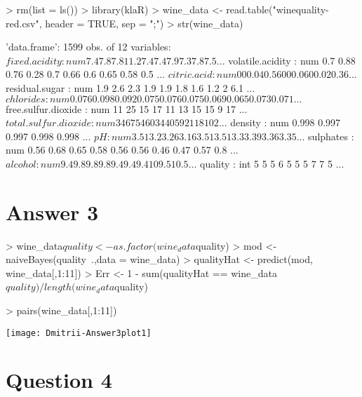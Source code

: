 \documentclass{article}
\begin{document}
\begin{Schunk}
\begin{Sinput}
> rm(list = ls())
> library(klaR)
> wine_data <- read.table("winequality-red.csv", header = TRUE, sep = ";")
> str(wine_data)
\end{Sinput}
\begin{Soutput}
'data.frame':	1599 obs. of  12 variables:
 $ fixed.acidity       : num  7.4 7.8 7.8 11.2 7.4 7.4 7.9 7.3 7.8 7.5 ...
 $ volatile.acidity    : num  0.7 0.88 0.76 0.28 0.7 0.66 0.6 0.65 0.58 0.5 ...
 $ citric.acid         : num  0 0 0.04 0.56 0 0 0.06 0 0.02 0.36 ...
 $ residual.sugar      : num  1.9 2.6 2.3 1.9 1.9 1.8 1.6 1.2 2 6.1 ...
 $ chlorides           : num  0.076 0.098 0.092 0.075 0.076 0.075 0.069 0.065 0.073 0.071 ...
 $ free.sulfur.dioxide : num  11 25 15 17 11 13 15 15 9 17 ...
 $ total.sulfur.dioxide: num  34 67 54 60 34 40 59 21 18 102 ...
 $ density             : num  0.998 0.997 0.997 0.998 0.998 ...
 $ pH                  : num  3.51 3.2 3.26 3.16 3.51 3.51 3.3 3.39 3.36 3.35 ...
 $ sulphates           : num  0.56 0.68 0.65 0.58 0.56 0.56 0.46 0.47 0.57 0.8 ...
 $ alcohol             : num  9.4 9.8 9.8 9.8 9.4 9.4 9.4 10 9.5 10.5 ...
 $ quality             : int  5 5 5 6 5 5 5 7 7 5 ...
\end{Soutput}
\end{Schunk}

\section*{Answer  3}

\begin{Schunk}
\begin{Sinput}
> wine_data$quality <- as.factor(wine_data$quality)
> mod <- naiveBayes(quality~.,data = wine_data)
> qualityHat <- predict(mod, wine_data[,1:11])
> Err <- 1 - sum(qualityHat == wine_data$quality)/length(wine_data$quality)
\end{Sinput}
\end{Schunk}
\begin{Schunk}
\begin{Sinput}
> pairs(wine_data[,1:11])
\end{Sinput}
\end{Schunk}
\texttt{[image: Dmitrii-Answer3plot1]}


\section*{Question 4}
\end{document}
